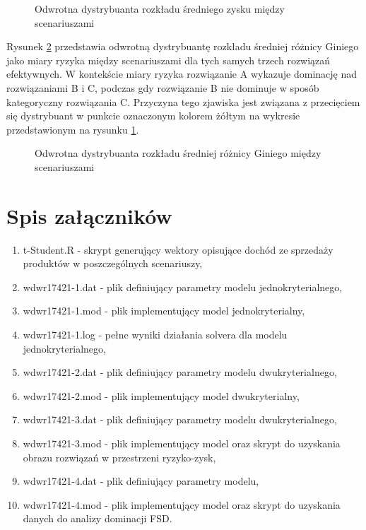 \documentclass[11pt,a4paper]{article}
\begin{document}
\begin{figure}[ht!]
\centering
\caption{Odwrotna dystrybuanta rozkładu średniego zysku między scenariuszami}
\label{fig:FSD-profit}
\end{figure}

Rysunek \ref{fig:FSD-risk} przedstawia odwrotną dystrybuantę rozkładu średniej różnicy Giniego jako miary ryzyka między scenariuszami dla tych samych trzech rozwiązań efektywnych. W kontekście miary ryzyka rozwiązanie A wykazuje dominację nad rozwiązaniami B i C, podczas gdy rozwiązanie B nie dominuje w sposób kategoryczny rozwiązania C. Przyczyna tego zjawiska jest związana z przecięciem się dystrybuant w punkcie oznaczonym kolorem żółtym na wykresie przedstawionym na rysunku \ref{fig:FSD-profit}.

\begin{figure}[ht!]
\centering
\caption{Odwrotna dystrybuanta rozkładu średniej różnicy Giniego między scenariuszami}
\label{fig:FSD-risk}
\end{figure}


\clearpage
{}
\listoftables

\section*{Spis załączników}
\begin{enumerate}
\item t-Student.R - skrypt generujący wektory opisujące dochód ze sprzedaży produktów w poszczególnych scenariuszy,
\item wdwr17421-1.dat - plik definiujący parametry modelu jednokryterialnego,
\item wdwr17421-1.mod - plik implementujący model jednokryterialny,
\item wdwr17421-1.log - pełne wyniki działania solvera dla modelu jednokryterialnego,
\item wdwr17421-2.dat - plik definiujący parametry modelu dwukryterialnego,
\item wdwr17421-2.mod - plik implementujący model dwukryterialny,
\item wdwr17421-3.dat - plik definiujący parametry modelu dwukryterialnego,
\item wdwr17421-3.mod - plik implementujący model oraz skrypt do uzyskania obrazu rozwiązań w przestrzeni ryzyko-zysk,
\item wdwr17421-4.dat - plik definiujący parametry modelu,
\item wdwr17421-4.mod - plik implementujący model oraz skrypt do uzyskania danych do analizy dominacji FSD.
\end{enumerate}
\end{document}
